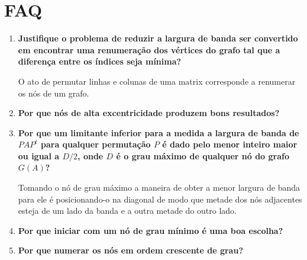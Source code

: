 \section{FAQ}
\begin{enumerate}
    \item \textbf{Justifique o problema de reduzir a largura de banda ser
        convertido em encontrar uma renumeração dos vértices do grafo tal que
        a diferença entre os índices seja mínima?}
        \cite{Fernanda:2005:ReordenacaoCCCG}

        O ato de permutar linhas e colunas de uma matrix corresponde a renumerar
        os nós de um grafo. \cite{Gibbs:1976:ReducingBandwidth}

    \item \textbf{Por que nós de alta excentricidade produzem bons
        resultados?} \cite{Fernanda:2005:ReordenacaoCCCG}

    \item \textbf{Por que um limitante inferior para a medida a largura de
        banda de $P A P^t$ para qualquer permutação $P$ é dado pelo menor
        inteiro maior ou igual a $D/2$, onde $D$ é o grau máximo de
        qualquer nó do grafo $G(A)$?} \cite{Cuthill:1969:ReducingBandwidth}

        Tomando o nó de grau máximo a maneira de obter a menor largura de
        banda para ele é posicionando-o na diagonal de modo que metade dos nós
        adjacentes esteja de um lado da banda e a outra metade do outro lado.

    \item \textbf{Por que iniciar com um nó de grau mínimo é uma boa escolha?}
        \cite{Cuthill:1969:ReducingBandwidth}

    \item \textbf{Por que numerar os nós em ordem crescente de grau?}
        \cite{Cuthill:1969:ReducingBandwidth}


\end{enumerate}

